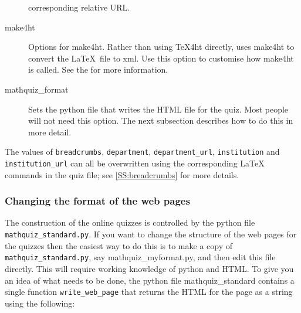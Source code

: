 \documentclass[svgnames]{article}
\begin{document}
\begin{description}
          corresponding relative URL.
          \item[make4ht]
          Options for \textsf{make4ht}. Rather than using \TeX4ht
          directly, \MathQuiz uses \textsf{make4ht} to convert the
          \LaTeX\ file to \textsf{xml}. Use this option to
          customise how \textsf{make4ht} is called. See the
           for more information.
        \item[mathquiz\_format]
          Sets the python file that writes the HTML file for the quiz.
          Most people will not need this option. The next subsection
          describes how to do this in more detail.
    \end{description}

    The values of \Verb|breadcrumbs|, \Verb|department|, \Verb|department_url|,
    \Verb|institution| and \Verb|institution_url| can all be overwritten
    using the corresponding  \LaTeX{} commands in the quiz file; see
    \autoref{SS:breadcrumbs} for more details.


  \subsubsection{Changing the format of the \MathQuiz web pages}
  The construction of the online quizzes is controlled by the python
  file \verb!mathquiz_standard.py!. If you want to change the structure
  of the web pages for the quizzes then the easiest way to do this is to make a
  copy of \verb!mathquiz_standard.py!, say \textsf{mathquiz\_myformat.py}, and
  then edit this file directly. This will require working knowledge of
  python and HTML. To give you an idea of what needs to be done,
  the python file \textsf{mathquiz\_standard} contains a single
  function \texttt{write\_web\_page} that returns the HTML for the page
  as a string using the following:
\end{document}
